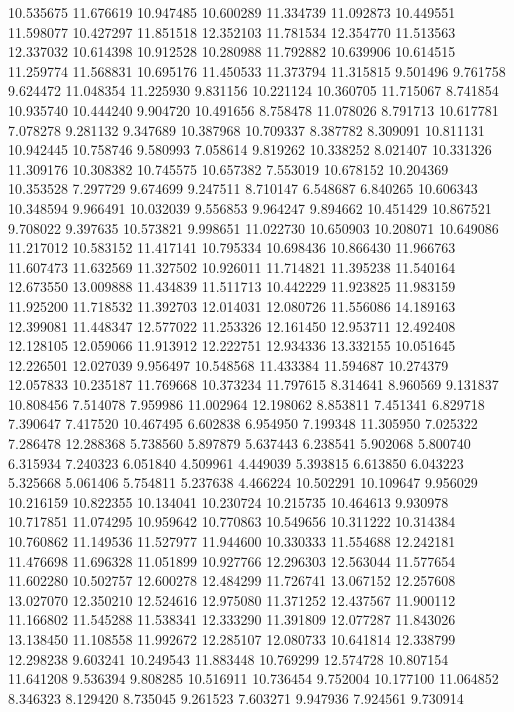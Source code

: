10.535675
11.676619
10.947485
10.600289
11.334739
11.092873
10.449551
11.598077
10.427297
11.851518
12.352103
11.781534
12.354770
11.513563
12.337032
10.614398
10.912528
10.280988
11.792882
10.639906
10.614515
11.259774
11.568831
10.695176
11.450533
11.373794
11.315815
9.501496
9.761758
9.624472
11.048354
11.225930
9.831156
10.221124
10.360705
11.715067
8.741854
10.935740
10.444240
9.904720
10.491656
8.758478
11.078026
8.791713
10.617781
7.078278
9.281132
9.347689
10.387968
10.709337
8.387782
8.309091
10.811131
10.942445
10.758746
9.580993
7.058614
9.819262
10.338252
8.021407
10.331326
11.309176
10.308382
10.745575
10.657382
7.553019
10.678152
10.204369
10.353528
7.297729
9.674699
9.247511
8.710147
6.548687
6.840265
10.606343
10.348594
9.966491
10.032039
9.556853
9.964247
9.894662
10.451429
10.867521
9.708022
9.397635
10.573821
9.998651
11.022730
10.650903
10.208071
10.649086
11.217012
10.583152
11.417141
10.795334
10.698436
10.866430
11.966763
11.607473
11.632569
11.327502
10.926011
11.714821
11.395238
11.540164
12.673550
13.009888
11.434839
11.511713
10.442229
11.923825
11.983159
11.925200
11.718532
11.392703
12.014031
12.080726
11.556086
14.189163
12.399081
11.448347
12.577022
11.253326
12.161450
12.953711
12.492408
12.128105
12.059066
11.913912
12.222751
12.934336
13.332155
10.051645
12.226501
12.027039
9.956497
10.548568
11.433384
11.594687
10.274379
12.057833
10.235187
11.769668
10.373234
11.797615
8.314641
8.960569
9.131837
10.808456
7.514078
7.959986
11.002964
12.198062
8.853811
7.451341
6.829718
7.390647
7.417520
10.467495
6.602838
6.954950
7.199348
11.305950
7.025322
7.286478
12.288368
5.738560
5.897879
5.637443
6.238541
5.902068
5.800740
6.315934
7.240323
6.051840
4.509961
4.449039
5.393815
6.613850
6.043223
5.325668
5.061406
5.754811
5.237638
4.466224
10.502291
10.109647
9.956029
10.216159
10.822355
10.134041
10.230724
10.215735
10.464613
9.930978
10.717851
11.074295
10.959642
10.770863
10.549656
10.311222
10.314384
10.760862
11.149536
11.527977
11.944600
10.330333
11.554688
12.242181
11.476698
11.696328
11.051899
10.927766
12.296303
12.563044
11.577654
11.602280
10.502757
12.600278
12.484299
11.726741
13.067152
12.257608
13.027070
12.350210
12.524616
12.975080
11.371252
12.437567
11.900112
11.166802
11.545288
11.538341
12.333290
11.391809
12.077287
11.843026
13.138450
11.108558
11.992672
12.285107
12.080733
10.641814
12.338799
12.298238
9.603241
10.249543
11.883448
10.769299
12.574728
10.807154
11.641208
9.536394
9.808285
10.516911
10.736454
9.752004
10.177100
11.064852
8.346323
8.129420
8.735045
9.261523
7.603271
9.947936
7.924561
9.730914
